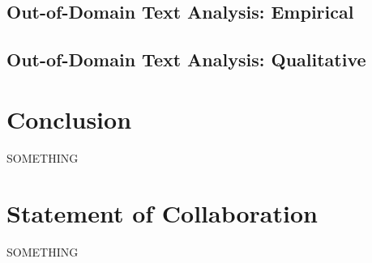 \documentclass[11pt,a4paper]{article}
\begin{document}

\subsection{Out-of-Domain Text Analysis: Empirical}%
\label{sec:out_domain_text_analysis_empirical}


\subsection{Out-of-Domain Text Analysis: Qualitative}%
\label{sub:out_domain_text_analysis_qualitative}


\section{Conclusion}%
\label{sec:conclusion}

SOMETHING




\section{Statement of Collaboration}
SOMETHING






\appendix
\end{document}
